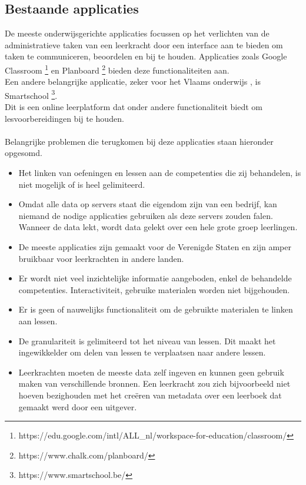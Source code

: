 \documentclass[12pt,journal]{IEEEtran}
\begin{document}
	\subsection{Bestaande applicaties}
	\label{subsection:existing-tools}
	\noindent De meeste onderwijsgerichte applicaties focussen op het verlichten van de administratieve taken van een leerkracht door een interface aan te bieden om taken te communiceren, beoordelen en bij te houden.
	Applicaties zoals Google Classroom \footnote{https://edu.google.com/intl/ALL\_nl/workspace-for-education/classroom/} en Planboard \footnote{https://www.chalk.com/planboard/} bieden deze functionaliteiten aan.\\
	Een andere belangrijke applicatie, zeker voor het Vlaams onderwijs \cite{destandaard}, is Smartschool \footnote{https://www.smartschool.be/}.\\
	Dit is een online leerplatform dat onder andere functionaliteit biedt om lesvoorbereidingen bij te houden.\\ \\
	Belangrijke problemen die terugkomen bij deze applicaties staan hieronder opgesomd.
	\begin{itemize}
		\item Het linken van oefeningen en lessen aan de competenties die zij behandelen, is niet mogelijk of is heel gelimiteerd.
  		\item Omdat alle data op servers staat die eigendom zijn van een bedrijf, kan niemand de nodige applicaties gebruiken als deze servers zouden falen. Wanneer de data lekt, wordt data gelekt over een hele grote groep leerlingen.
    	\item De meeste applicaties zijn gemaakt voor de Verenigde Staten en zijn amper bruikbaar voor leerkrachten in andere landen.
     	\item Er wordt niet veel inzichtelijke informatie aangeboden, enkel de behandelde competenties. Interactiviteit, gebruike materialen worden niet bijgehouden.
      	\item Er is geen of nauwelijks functionaliteit om de gebruikte materialen te linken aan lessen.
       	\item De granulariteit is gelimiteerd tot het niveau van lessen. Dit maakt het ingewikkelder om delen van lessen te verplaatsen naar andere lessen.
        \item Leerkrachten moeten de meeste data zelf ingeven en kunnen geen gebruik maken van verschillende bronnen. Een leerkracht zou zich bijvoorbeeld niet hoeven bezighouden met het creëren van metadata over een leerboek dat gemaakt werd door een uitgever.  
	\end{itemize} 
\end{document}
